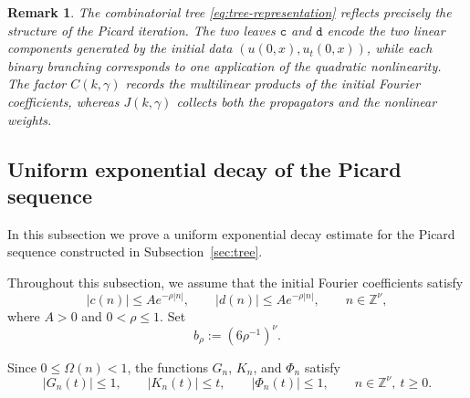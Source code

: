 \documentclass[12pt,reqno,tbtags]{amsart}
\newtheorem{remark}{Remark}[section]
\newcommand\1{\mathbbm{1}}
\begin{document}
\begin{remark}\label{rem:tree-structure}
The combinatorial tree \eqref{eq:tree-representation} reflects precisely the structure
of the Picard iteration. The two leaves $\mathtt{c}$ and $\mathtt{d}$ encode the two
linear components generated by the initial data $(u(0,x),u_t(0,x))$, while each binary
branching corresponds to one application of the quadratic nonlinearity. The factor
$C(k,\gamma)$ records the multilinear products of the initial Fourier coefficients,
whereas $J(k,\gamma)$ collects both the propagators and the nonlinear weights.
\end{remark}

\subsection{Uniform exponential decay of the Picard sequence}\label{sec:uniform-decay}

In this subsection we prove a uniform exponential decay estimate for the Picard
sequence constructed in Subsection~\ref{sec:tree}. 


Throughout this subsection, we assume that the initial Fourier coefficients satisfy
\begin{equation}\label{eq:exp-decay-initial}
|c(n)|\leq A e^{-\rho |n|},
\qquad
|d(n)|\leq A e^{-\rho |n|},
\qquad n\in \mathbb{Z}^{\nu},
\end{equation}
where $A>0$ and $0<\rho\leq 1$. Set
\begin{equation*}
b_{\rho}:=(6\rho^{-1})^{\nu}.
\end{equation*}

Since $0\leq \Omega(n)<1$, the functions $G_n$, $K_n$, and $\Phi_n$ satisfy
\begin{equation}\label{eq:basic-propagator-bounds}
|G_n(t)|\leq 1,
\qquad
|K_n(t)|\leq t,
\qquad
|\Phi_n(t)|\leq 1,
\qquad n\in \mathbb{Z}^{\nu},\ t\geq 0.
\end{equation}
\end{document}
